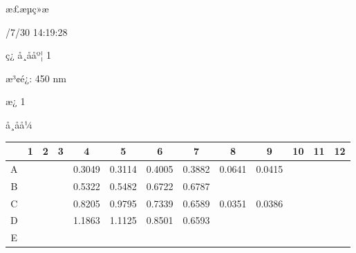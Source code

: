 \documentclass[UTF8,10pt,a4paper,fontset=fandol]{ctexart}
\renewcommand{\arraystretch}{1.15}
\newcommand{\fieldvalue}[1]{#1}
\begin{document}
\noindent
æ£æµç»æ

/7/30 14:19:28

\noindent
ç¿ å¸ååº¦ 1

\noindent
æ³¢é¿: 450 nm

\noindent
æ¿ 1

\noindent
å¸åå¼

\begin{center}
\scriptsize
\renewcommand{\arraystretch}{1.55}
\begin{tabular}{c|c|c|c|c|c|c|c|c|c|c|c|c}
 &1&2&3&4&5&6&7&8&9&10&11&12\\ \hline
A&&&&
\fieldvalue{0.3049}&
\fieldvalue{0.3114}&
\fieldvalue{0.4005}&
\fieldvalue{0.3882}&
\fieldvalue{0.0641}&
\fieldvalue{0.0415}&\\ \hline
B&&&&
\fieldvalue{0.5322}&
\fieldvalue{0.5482}&
\fieldvalue{0.6722}&
\fieldvalue{0.6787}&&&\\ \hline
C&&&&
\fieldvalue{0.8205}&
\fieldvalue{0.9795}&
\fieldvalue{0.7339}&
\fieldvalue{0.6589}&
\fieldvalue{0.0351}&
\fieldvalue{0.0386}&\\ \hline
D&&&&
\fieldvalue{1.1863}&
\fieldvalue{1.1125}&
\fieldvalue{0.8501}&
\fieldvalue{0.6593}&&&\\ \hline
E&&&&

\end{tabular}
\end{center}
\end{document}
